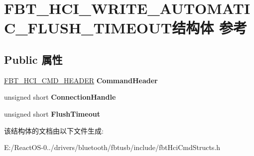 \hypertarget{struct_f_b_t___h_c_i___w_r_i_t_e___a_u_t_o_m_a_t_i_c___f_l_u_s_h___t_i_m_e_o_u_t}{}\section{F\+B\+T\+\_\+\+H\+C\+I\+\_\+\+W\+R\+I\+T\+E\+\_\+\+A\+U\+T\+O\+M\+A\+T\+I\+C\+\_\+\+F\+L\+U\+S\+H\+\_\+\+T\+I\+M\+E\+O\+U\+T结构体 参考}
\label{struct_f_b_t___h_c_i___w_r_i_t_e___a_u_t_o_m_a_t_i_c___f_l_u_s_h___t_i_m_e_o_u_t}
\subsection*{Public 属性}
\begin{DoxyCompactItemize}
\item 
\mbox{\label{struct_f_b_t___h_c_i___w_r_i_t_e___a_u_t_o_m_a_t_i_c___f_l_u_s_h___t_i_m_e_o_u_t_a4bad3399c13769c7087a5ab6572c352c}} 
\hyperlink{struct_f_b_t___h_c_i___c_m_d___h_e_a_d_e_r}{F\+B\+T\+\_\+\+H\+C\+I\+\_\+\+C\+M\+D\+\_\+\+H\+E\+A\+D\+ER} {\bfseries Command\+Header}
\item 
\mbox{\label{struct_f_b_t___h_c_i___w_r_i_t_e___a_u_t_o_m_a_t_i_c___f_l_u_s_h___t_i_m_e_o_u_t_af730724633333e497a6767e84508bcfa}} 
unsigned short {\bfseries Connection\+Handle}
\item 
\mbox{\label{struct_f_b_t___h_c_i___w_r_i_t_e___a_u_t_o_m_a_t_i_c___f_l_u_s_h___t_i_m_e_o_u_t_a9e180eed6aedd199b3a61ce3e877aba7}} 
unsigned short {\bfseries Flush\+Timeout}
\end{DoxyCompactItemize}


该结构体的文档由以下文件生成\+:\begin{DoxyCompactItemize}
\item 
E\+:/\+React\+O\+S-\/0../drivers/bluetooth/fbtusb/include/fbt\+Hci\+Cmd\+Structs.\+h\end{DoxyCompactItemize}
